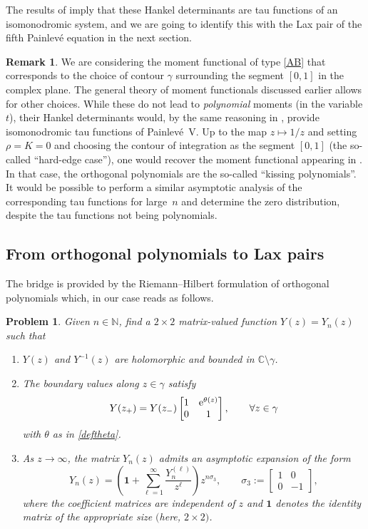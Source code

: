 \documentclass[pdftex]{sigma}
\numberwithin{equation}{section}
\newtheorem{problem}[Theorem]{Problem}
\theoremstyle{definition}
\newtheorem{Remark}[Theorem]{Remark}
\def\le{\left}
\def\ri{\right}
\def\be{\begin{equation}}
\def\ee{\end{equation}}
\def \1{\mathbf 1}
\def\C{{\mathbb C}}
\def\s{\sigma}
\begin{document}
The results of \cite{Bertola:Semiiso} imply that these Hankel determinants are tau functions of an isomonodromic system, and we are going to identify this with the Lax pair of the fifth Painlev\'e equation in the next section.

\begin{Remark}
We are considering the moment functional of type \eqref{AB} that corresponds to the choice of contour $\gamma$ surrounding the segment $[0,1]$ in the complex plane. The general theory of moment functionals discussed earlier allows for other choices. While these do not lead to {\it polynomial} moments (in the variable $t$), their Hankel determinants would, by the same reasoning in \cite{Bertola:Semiiso}, provide isomonodromic tau functions of Painlev\'e~V. Up to the map $z\mapsto 1/z$ and setting ${\rho}= {K} =0$ and choosing the contour of integration as the segment $[0,1]$ (the so-called ``hard-edge case''), one would recover the moment functional appearing in \cite{Deano}. In that case, the orthogonal polynomials are the so-called ``kissing polynomials''. It would be possible to perform a similar asymptotic analysis of the corresponding tau functions for large~$n$ and determine the zero distribution, despite the tau functions not being polynomials.
\end{Remark}
%
\subsection{From orthogonal polynomials to Lax pairs}
\label{SecOPLP}
The bridge is provided by the Riemann--Hilbert formulation of orthogonal polynomials \cite{FIK} which, in our case reads as follows.
\begin{problem}
\label{RHPY}
Given $n\in \mathbb N$,
find a $2\times 2$ matrix-valued function $Y(z)= Y_n(z)$ such that
\begin{enumerate}\itemsep=0pt
\item[$(1)$] $Y(z)$ and $Y^{-1}(z)$ are holomorphic and bounded in $\C\setminus \gamma$.
\item[$(2)$] The boundary values along $z\in \gamma$ satisfy
\[
Y(z_+) = Y(z_-) \begin{bmatrix}
1&{\rm e}^{\theta(z)}\\
0 & 1
\end{bmatrix},\qquad \forall z\in \gamma
\]
with $\theta$ as in \eqref{deftheta}.
\item[$(3)$] As $z\to \infty$, the matrix $Y_n(z)$ admits an asymptotic expansion of the form
\be
\label{asympY}
Y_n(z) = \le(\1 + \sum_{\ell=1}^\infty \frac {Y_n^{(\ell)}} {z^\ell} \ri)z^{n\s_3}, \qquad \s_3:= \begin{bmatrix} 1&0\\ 0&-1\end{bmatrix},
\ee
where the coefficient matrices  are independent of $z$ and $\1$ denotes the identity matrix of the appropriate size $($here, $2\times 2)$.
\end{enumerate}
\end{problem}
\end{document}
